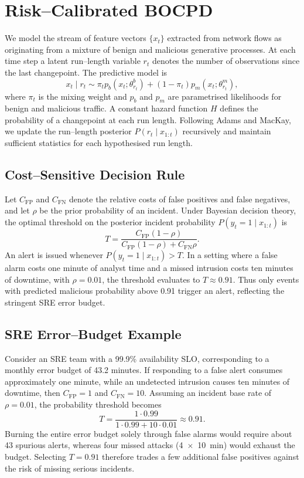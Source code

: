 \documentclass{article}
\begin{document}
\section{Risk--Calibrated BOCPD}
We model the stream of feature vectors \(\{x_t\}\) extracted from network flows as originating from a mixture of benign and malicious generative processes.  At each time step a latent run--length variable \(r_t\) denotes the number of observations since the last changepoint.  The predictive model is
\begin{equation}
  x_t \mid r_t \sim \pi_t p_b(x_t; \theta^b_{r_t}) + (1-\pi_t) p_m(x_t; \theta^m_{r_t}),
\end{equation}
where \(\pi_t\) is the mixing weight and \(p_b\) and \(p_m\) are parametrised likelihoods for benign and malicious traffic.  A constant hazard function \(H\) defines the probability of a changepoint at each run length.  Following Adams and MacKay\cite{adams2007bocpd}, we update the run--length posterior \(P(r_t \mid x_{1:t})\) recursively and maintain sufficient statistics for each hypothesised run length.

\subsection{Cost--Sensitive Decision Rule}
Let \(C_{\mathrm{FP}}\) and \(C_{\mathrm{FN}}\) denote the relative costs of false positives and false negatives, and let \(\rho\) be the prior probability of an incident.  Under Bayesian decision theory, the optimal threshold on the posterior incident probability \(P(y_t=1\mid x_{1:t})\) is
\begin{equation}
  T = \frac{C_{\mathrm{FP}}(1-\rho)}{C_{\mathrm{FP}}(1-\rho) + C_{\mathrm{FN}} \rho}.
\end{equation}
An alert is issued whenever \(P(y_t=1\mid x_{1:t}) > T\).  In a setting where a false alarm costs one minute of analyst time and a missed intrusion costs ten minutes of downtime, with \(\rho=0.01\), the threshold evaluates to \(T\approx0.91\).  Thus only events with predicted malicious probability above 0.91 trigger an alert, reflecting the stringent SRE error budget.

\subsection{SRE Error--Budget Example}
Consider an SRE team with a 99.9\% availability SLO, corresponding to a monthly error budget of 43.2 minutes.  If responding to a false alert consumes approximately one minute, while an undetected intrusion causes ten minutes of downtime, then \(C_{\mathrm{FP}}=1\) and \(C_{\mathrm{FN}}=10\).  Assuming an incident base rate of \(\rho=0.01\), the probability threshold becomes
\[
  T = \frac{1\cdot0.99}{1\cdot0.99 + 10\cdot0.01} \approx 0.91.
\]
Burning the entire error budget solely through false alarms would require about 43 spurious alerts, whereas four missed attacks (4~\(\times\)~10~min) would exhaust the budget.  Selecting \(T=0.91\) therefore trades a few additional false positives against the risk of missing serious incidents.
\end{document}
